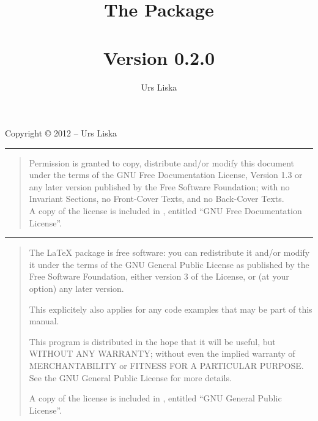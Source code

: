 \documentclass{article}
\begin{document}
\newcommand{\glyphlist}[3]{%
	\begin{figure}[htbp]
		\centering
		\texttt{[image: glyphlist/resources/\#3]}
		\caption{#1}
		\label{fig:#2}
	\end{figure}
}


\title{The \lilyglyphs Package\\~\\
	\normalsize Version 0.2.0}
\author{Urs Liska}

\maketitle

\pagebreak

\label{copyright}

\noindent Copyright \copyright{} 2012 -- Urs Liska

\medskip
\hrule

\begin{quote}
Permission is granted to copy, distribute and/or modify this document
under the terms of the GNU Free Documentation License, Version 1.3
or any later version published by the Free Software Foundation;
with no Invariant Sections, no Front-Cover Texts, and no Back-Cover Texts.\\
A copy of the license is included in , entitled \enquote{GNU Free Documentation License}.
\end{quote}

\hrule

\begin{quote}
The \lilyglyphs{} \LaTeX{} package is free software: you can redistribute it and/or modify  
it under the terms of the GNU General Public License as published by  
the Free Software Foundation, either version 3 of the License, or     
(at your option) any later version.         
  
This explicitely also applies for any code examples that may be part of this manual.
                                                                        
This program is distributed in the hope that it will be useful,       
but WITHOUT ANY WARRANTY; without even the implied warranty of        
MERCHANTABILITY or FITNESS FOR A PARTICULAR PURPOSE. See the          
GNU General Public License for more details.                          

A copy of the license is included in , entitled \enquote{GNU
General Public License}.

\end{quote}
\end{document}
